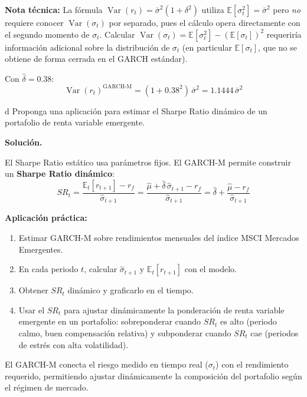 \documentclass[11pt,a4paper]{article}
\newcommand{\E}{\mathbb{E}}
\newcommand{\Var}{\operatorname{Var}}
\newcommand{\sigmabar}{\bar{\sigma}^2}
\begin{document}
\textbf{Nota técnica:} La fórmula $\Var(r_t) = \sigmabar(1+\delta^2)$ utiliza $\E[\sigma_t^2]=\sigmabar$ pero \emph{no} requiere conocer $\Var(\sigma_t)$ por separado, pues el cálculo opera directamente con el segundo momento de $\sigma_t$. Calcular $\Var(\sigma_t) = \E[\sigma_t^2] - (\E[\sigma_t])^2$ requeriría información adicional sobre la distribución de $\sigma_t$ (en particular $\E[\sigma_t]$, que no se obtiene de forma cerrada en el GARCH estándar).

Con $\hat{\delta}=0.38$:
\[
\Var(r_t)^{\text{GARCH-M}} = (1 + 0.38^2)\,\sigmabar = 1.1444\,\sigmabar
\]

\begin{cajaInciso}{d}
Proponga una aplicación para estimar el Sharpe Ratio dinámico de un portafolio de renta variable emergente.
\end{cajaInciso}

\textbf{Solución.}

El Sharpe Ratio estático usa parámetros fijos. El GARCH-M permite construir un \textbf{Sharpe Ratio dinámico}:
\[
SR_t = \frac{\E_t[r_{t+1}] - r_f}{\hat{\sigma}_{t+1}} = \frac{\hat{\mu} + \hat{\delta}\,\hat{\sigma}_{t+1} - r_f}{\hat{\sigma}_{t+1}} = \hat{\delta} + \frac{\hat{\mu} - r_f}{\hat{\sigma}_{t+1}}
\]

\textbf{Aplicación práctica:}
\begin{enumerate}[leftmargin=*]
  \item Estimar GARCH-M sobre rendimientos mensuales del índice MSCI Mercados Emergentes.
  \item En cada periodo $t$, calcular $\hat{\sigma}_{t+1}$ y $\E_t[r_{t+1}]$ con el modelo.
  \item Obtener $SR_t$ dinámico y graficarlo en el tiempo.
  \item Usar el $SR_t$ para ajustar dinámicamente la ponderación de renta variable emergente en un portafolio: sobreponderar cuando $SR_t$ es alto (periodo calmo, buen compensación relativa) y subponderar cuando $SR_t$ cae (periodos de estrés con alta volatilidad).
\end{enumerate}

\begin{cajaHallazgo}
El GARCH-M conecta el riesgo medido en tiempo real ($\sigma_t$) con el rendimiento requerido, permitiendo ajustar dinámicamente la composición del portafolio según el régimen de mercado.
\end{cajaHallazgo}
\end{document}
